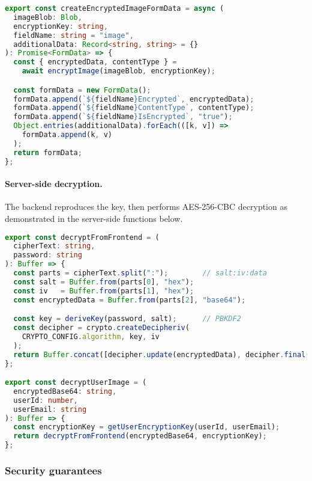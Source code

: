 \begin{lstlisting}[language=TypeScript, caption={Creation of FormData for encrypted image upload}, label={lst:form-data}]
export const createEncryptedImageFormData = async (
  imageBlob: Blob,
  encryptionKey: string,
  fieldName: string = "image",
  additionalData: Record<string, string> = {}
): Promise<FormData> => {
  const { encryptedData, contentType } =
    await encryptImage(imageBlob, encryptionKey);

  const formData = new FormData();
  formData.append(`${fieldName}Encrypted`, encryptedData);
  formData.append(`${fieldName}ContentType`, contentType);
  formData.append(`${fieldName}IsEncrypted`, "true");
  Object.entries(additionalData).forEach(([k, v]) =>
    formData.append(k, v)
  );
  return formData;
};
\end{lstlisting}

\paragraph{Server-side decryption.}
The backend reproduces the key, then performs AES-256-CBC decryption as demonstrated in the server-side functions below.

\begin{lstlisting}[language=TypeScript, caption={Server-side decryption of encrypted data from the frontend}, label={lst:server-decryption}]
export const decryptFromFrontend = (
  cipherText: string,
  password: string
): Buffer => {
  const parts = cipherText.split(":");        // salt:iv:data
  const salt = Buffer.from(parts[0], "hex");
  const iv   = Buffer.from(parts[1], "hex");
  const encryptedData = Buffer.from(parts[2], "base64");

  const key = deriveKey(password, salt);      // PBKDF2
  const decipher = crypto.createDecipheriv(
    CRYPTO_CONFIG.algorithm, key, iv
  );
  return Buffer.concat([decipher.update(encryptedData), decipher.final()]);
};

export const decryptUserImage = (
  encryptedBase64: string,
  userId: number,
  userEmail: string
): Buffer => {
  const encryptionKey = getUserEncryptionKey(userId, userEmail);
  return decryptFromFrontend(encryptedBase64, encryptionKey);
};
\end{lstlisting}

\subsubsection{Security guarantees}

